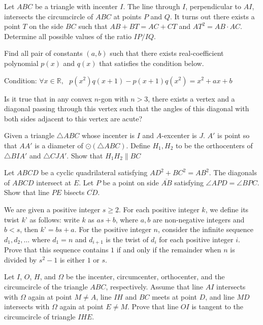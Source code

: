 \documentclass[11pt]{scrartcl}
\begin{document}
\begin{problem}[5363953658134647103]
Let $ABC$ be a triangle with incenter $I$. The line through $I$, perpendicular to $AI$, intersects the circumcircle of $ABC$ at points $P$ and $Q$. It turns out there exists a point $T$ on the side $BC$ such that $AB + BT = AC + CT$ and $AT^2 =  AB \cdot AC$. Determine all possible values of the ratio $IP/IQ$.
\end{problem}
\begin{problem}[3232480961068145020]
Find all pair of constants $(a,b)$ such that there exists real-coefficient polynomial $p(x)$ and $q(x)$ that satisfies the condition below.

Condition: $\forall x\in \mathbb R,$ $ $ $p(x^2)q(x+1)-p(x+1)q(x^2)=x^2+ax+b$
\end{problem}
\begin{problem}[552933284268039]
	Is it true that in any convex $n$-gon with $n > 3$, there exists a vertex and a diagonal passing through this vertex such that the angles of this diagonal with both sides adjacent to this vertex are acute?
\end{problem}
\begin{problem}[528504335909385]
Given a triangle $ \triangle{ABC} $ whose incenter is $ I $ and $ A $-excenter is $ J $. $ A' $ is point so that $ AA' $ is a diameter of $ \odot\left(\triangle{ABC}\right) $. Define $ H_{1}, H_{2} $ to be the orthocenters of $ \triangle{BIA'} $ and $ \triangle{CJA'} $. Show that $ H_{1}H_{2} \parallel BC $
\end{problem}
\begin{problem}[287986230573307]
Let $ABCD$ be a cyclic quadrilateral satisfying $AD^2 + BC^2 = AB^2$. The diagonals of $ABCD$ intersect at $E$. Let $P$ be a point on side $\overline{AB}$ satisfying $\angle APD = \angle BPC$. Show that line $PE$ bisects $\overline{CD}$.
\end{problem}
\begin{problem}[5952830561616844902]
	We are given a positive integer $s \ge 2$. For each positive integer $k$, we define its twist $k’$ as follows: write $k$ as $as+b$, where $a, b$ are non-negative integers and $b < s$, then $k’ = bs+a$. For the positive integer $n$, consider the infinite sequence $d_1, d_2, \dots$ where $d_1=n$ and $d_{i+1}$ is the twist of $d_i$ for each positive integer $i$.
Prove that this sequence contains $1$ if and only if the remainder when $n$ is divided by $s^2-1$ is either $1$ or $s$.
\end{problem}
\begin{problem}[183354438240037]
Let $I$, $O$, $H$, and $\Omega$ be the incenter, circumcenter, orthocenter, and the circumcircle of the triangle $ABC$, respectively. Assume that line $AI$ intersects with $\Omega$ again at point $M\neq A$, line $IH$ and $BC$ meets at point $D$, and line $MD$ intersects with $\Omega$ again at point $E\neq M$. Prove that line $OI$ is tangent to the circumcircle of triangle $IHE$.
\end{problem}
\end{document}
